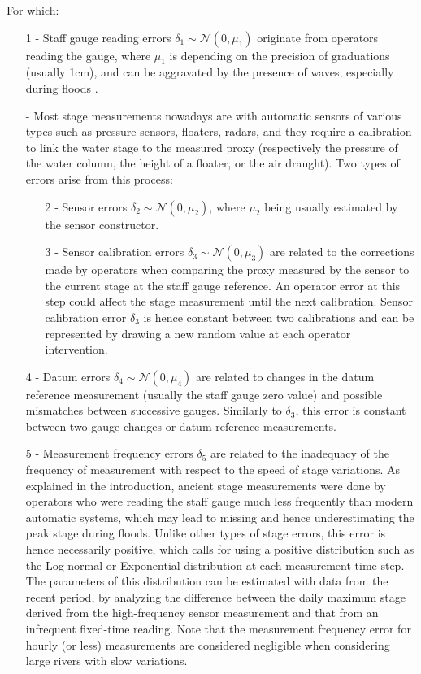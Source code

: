 \documentclass[11pt]{article}
\begin{document}
    For which: 
    \begin{itemize}
    
        \item[1 -]Staff gauge reading errors $\delta_1 \sim \mathcal{N}(0,\mu_1)$ originate from operators reading the gauge, where $\mu_1$ is depending on the precision of graduations (usually 1cm), and can be aggravated by the presence of waves, especially during floods \citep{mcmillan_benchmarking_2012}.

        \item[-]Most stage measurements nowadays are with automatic sensors of various types such as pressure sensors, floaters, radars, and they require a calibration to link the water stage to the measured proxy (respectively the pressure of the water column, the height of a floater, or the air draught). Two types of errors arise from this process: 
        \begin{itemize}
            \item[2 -] Sensor errors $\delta_2 \sim \mathcal{N}(0,\mu_2)$, where $\mu_2$ being usually estimated by the sensor constructor.
                
            \item[3 -] Sensor calibration errors $\delta_3 \sim \mathcal{N}(0,\mu_3)$ are related to the corrections made by operators when comparing the proxy measured by the sensor to the current stage at the staff gauge reference. An operator error at this step could affect the stage measurement until the next calibration. Sensor calibration error $\delta_3$ is hence constant between two calibrations and can be represented by drawing a new random value at each operator intervention.
        \end{itemize}
    
        \item[4 -]Datum errors $\delta_4  \sim \mathcal{N}(0,\mu_4)$ are related to changes in the datum reference measurement (usually the staff gauge zero value) and possible mismatches between successive gauges. Similarly to $\delta_3$, this error is constant between two gauge changes or datum reference measurements. 
    
        \item[5 -] Measurement frequency errors $\delta_5$ are related to the inadequacy of the frequency of measurement with respect to the speed of stage variations. As explained in the introduction, ancient stage measurements were done by operators who were reading the staff gauge much less frequently than modern automatic systems, which may lead to missing and hence underestimating the peak stage during floods. Unlike other types of stage errors, this error is hence necessarily positive, which calls for using a positive distribution such as the Log-normal or Exponential distribution at each measurement time-step. The parameters of this distribution can be estimated with data from the recent period, by analyzing the difference between the daily maximum stage derived from the high-frequency sensor measurement and that from an infrequent fixed-time reading. Note that the measurement frequency error for hourly (or less) measurements are considered negligible when considering large rivers with slow variations. 
   

\end{itemize}
\end{document}
